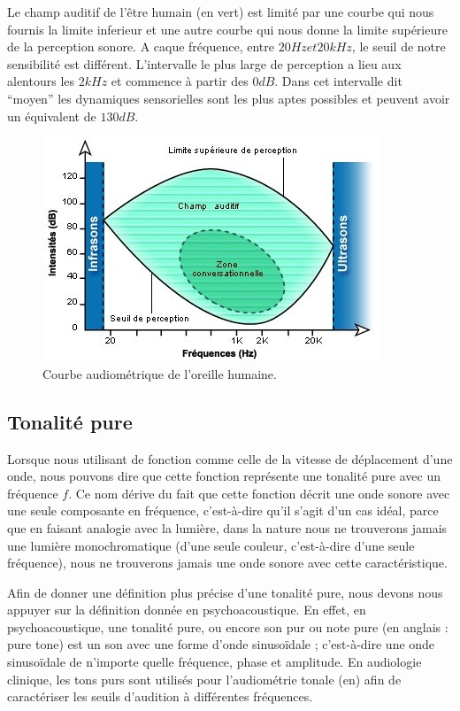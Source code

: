 \documentclass[conference,onecolumn]{IEEEtran}
\begin{document}
 Le champ auditif de l’être humain (en vert) est limité par une courbe qui nous fournis la limite inferieur et une autre courbe qui nous donne la limite supérieure de la perception sonore. A caque fréquence, entre $20 Hz et 20 kHz$, le seuil de notre sensibilité est différent. L’intervalle le plus large de perception a lieu aux alentours les $2 kHz$ et commence à partir des $0 dB$. Dans cet intervalle dit “moyen” les dynamiques sensorielles sont les plus aptes possibles et peuvent avoir un équivalent de $130 dB$.
 
 \begin{figure}[H]
 \centering
    \includegraphics[scale=1.5]{img3.jpg}
    \caption{Courbe audiométrique de l'oreille humaine.}
\end{figure}

 \subsection{Tonalité pure}
 Lorsque nous utilisant de fonction comme celle de la vitesse de déplacement d’une onde, nous pouvons dire que cette fonction représente une tonalité pure avec un fréquence $f$. Ce nom dérive du fait que cette fonction décrit une onde sonore avec une seule composante en fréquence, c’est-à-dire qu’il s’agit d’un cas idéal, parce que en faisant analogie avec la lumière, dans la nature nous ne trouverons jamais une lumière monochromatique (d’une seule couleur, c’est-à-dire d’une seule fréquence), nous ne trouverons jamais une onde sonore avec cette caractéristique.  

Afin de donner une définition plus précise d’une tonalité pure, nous devons nous appuyer sur la définition donnée en psychoacoustique. En effet, en psychoacoustique, une tonalité pure, ou encore son pur ou note pure (en anglais : pure tone) est un son avec une forme d'onde sinusoïdale ; c'est-à-dire une onde sinusoïdale de n'importe quelle fréquence, phase et amplitude. En audiologie clinique, les tons purs sont utilisés pour l'audiométrie tonale (en) afin de caractériser les seuils d'audition à différentes fréquences. 
\end{document}
